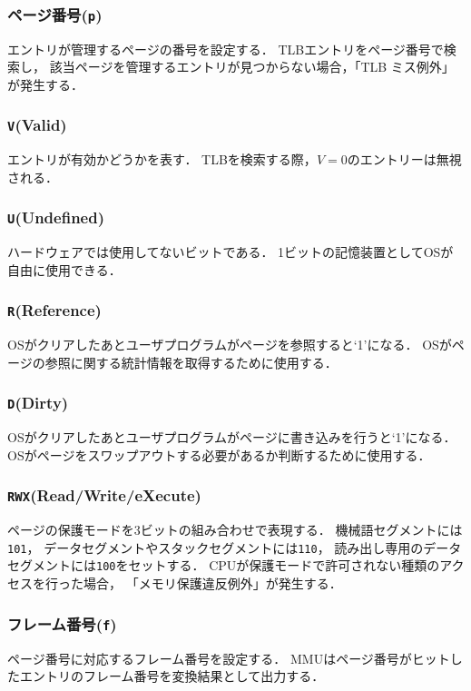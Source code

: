 \subsubsection{ページ番号(\texttt{p})} 
エントリが管理するページの番号を設定する．
TLBエントリをページ番号で検索し，
該当ページを管理するエントリが見つからない場合，「TLB ミス例外」が発生する．

\subsubsection{\texttt{V}(Valid)}
エントリが有効かどうかを表す．
TLBを検索する際，$V=0$のエントリーは無視される．

\subsubsection{\texttt{U}(Undefined)}
ハードウェアでは使用してないビットである．
1ビットの記憶装置としてOSが自由に使用できる．

\subsubsection{\texttt{R}(Reference)}
OSがクリアしたあとユーザプログラムがページを参照すると`1'になる．
OSがページの参照に関する統計情報を取得するために使用する．

\subsubsection{\texttt{D}(Dirty)}
OSがクリアしたあとユーザプログラムがページに書き込みを行うと`1'になる．
OSがページをスワップアウトする必要があるか判断するために使用する．

\subsubsection{\texttt{RWX}(Read/Write/eXecute)}
ページの保護モードを3ビットの組み合わせで表現する．
機械語セグメントには\texttt{101}，
データセグメントやスタックセグメントには\texttt{110}，
読み出し専用のデータセグメントには\texttt{100}をセットする．
CPUが保護モードで許可されない種類のアクセスを行った場合，
「メモリ保護違反例外」が発生する．

\subsubsection{フレーム番号(\texttt{f})}
ページ番号に対応するフレーム番号を設定する．
MMUはページ番号がヒットしたエントリのフレーム番号を変換結果として出力する．

